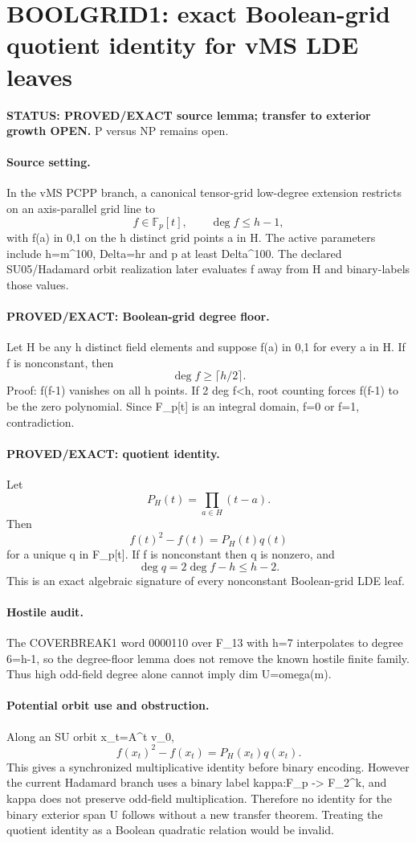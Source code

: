 \documentclass[11pt]{article}\usepackage[margin=.88in]{geometry}\usepackage{amsmath,amssymb}
\begin{document}
\section*{BOOLGRID1: exact Boolean-grid quotient identity for vMS LDE leaves}
\textbf{STATUS: PROVED/EXACT source lemma; transfer to exterior growth OPEN.} P versus NP remains open.

\paragraph{Source setting.}
In the vMS PCPP branch, a canonical tensor-grid low-degree extension restricts on an axis-parallel grid line to
\[
f\in\mathbb F_p[t],\qquad \deg f\le h-1,
\]
with f(a) in {0,1} on the h distinct grid points a in H. The active parameters include h=m^{100}, Delta=hr and p at least Delta^{100}. The declared SU05/Hadamard orbit realization later evaluates f away from H and binary-labels those values.

\paragraph{PROVED/EXACT: Boolean-grid degree floor.}
Let H be any h distinct field elements and suppose f(a) in {0,1} for every a in H. If f is nonconstant, then
\[
\boxed{\deg f\ge \lceil h/2\rceil.}
\]
Proof: f(f-1) vanishes on all h points. If 2 deg f<h, root counting forces f(f-1) to be the zero polynomial. Since F_p[t] is an integral domain, f=0 or f=1, contradiction.

\paragraph{PROVED/EXACT: quotient identity.}
Let
\[
P_H(t)=\prod_{a\in H}(t-a).
\]
Then
\[
\boxed{f(t)^2-f(t)=P_H(t)q(t)}
\]
for a unique q in F_p[t]. If f is nonconstant then q is nonzero, and
\[
\deg q=2\deg f-h\le h-2.
\]
This is an exact algebraic signature of every nonconstant Boolean-grid LDE leaf.

\paragraph{Hostile audit.}
The COVERBREAK1 word 0000110 over F_13 with h=7 interpolates to degree 6=h-1, so the degree-floor lemma does not remove the known hostile finite family. Thus high odd-field degree alone cannot imply dim U=omega(m).

\paragraph{Potential orbit use and obstruction.}
Along an SU orbit x_t=A^t v_0,
\[
f(x_t)^2-f(x_t)=P_H(x_t)q(x_t).
\]
This gives a synchronized multiplicative identity before binary encoding. However the current Hadamard branch uses a binary label kappa:F_p -> F_2^k, and kappa does not preserve odd-field multiplication. Therefore no identity for the binary exterior span U follows without a new transfer theorem. Treating the quotient identity as a Boolean quadratic relation would be invalid.
\end{document}
